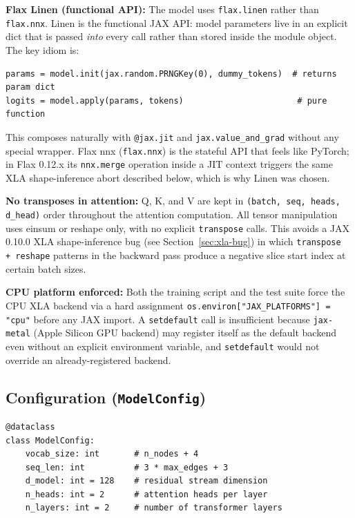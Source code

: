 \documentclass[11pt, a4paper]{article}
\begin{document}
\textbf{Flax Linen (functional API):}
The model uses \texttt{flax.linen} rather than \texttt{flax.nnx}. Linen is the
functional JAX API: model parameters live in an explicit dict that is passed
\emph{into} every call rather than stored inside the module object. The key
idiom is:
\begin{lstlisting}
params = model.init(jax.random.PRNGKey(0), dummy_tokens)  # returns param dict
logits = model.apply(params, tokens)                       # pure function
\end{lstlisting}
This composes naturally with \texttt{@jax.jit} and \texttt{jax.value\_and\_grad}
without any special wrapper. Flax nnx (\texttt{flax.nnx}) is the stateful API
that feels like PyTorch; in Flax 0.12.x its \texttt{nnx.merge} operation inside
a JIT context triggers the same XLA shape-inference abort described below, which
is why Linen was chosen.

\textbf{No transposes in attention:}
Q, K, and V are kept in \texttt{(batch, seq, heads, d\_head)} order throughout
the attention computation. All tensor manipulation uses einsum or reshape only,
with no explicit \texttt{transpose} calls. This avoids a JAX 0.10.0 XLA
shape-inference bug (see Section~\ref{sec:xla-bug}) in which
\texttt{transpose\,+\,reshape} patterns in the backward pass produce a negative
slice start index at certain batch sizes.

\textbf{CPU platform enforced:}
Both the training script and the test suite force the CPU XLA backend via a
hard assignment \texttt{os.environ["JAX\_PLATFORMS"] = "cpu"} before any JAX
import. A \texttt{setdefault} call is insufficient because \texttt{jax-metal}
(Apple Silicon GPU backend) may register itself as the default backend even
without an explicit environment variable, and \texttt{setdefault} would not
override an already-registered backend.

\subsection{Configuration (\texttt{ModelConfig})}

\begin{lstlisting}
@dataclass
class ModelConfig:
    vocab_size: int       # n_nodes + 4
    seq_len: int          # 3 * max_edges + 3
    d_model: int = 128    # residual stream dimension
    n_heads: int = 2      # attention heads per layer
    n_layers: int = 2     # number of transformer layers
\end{lstlisting}
\end{document}
